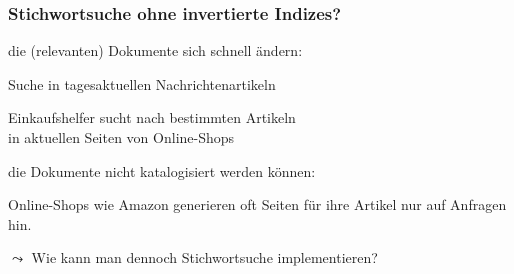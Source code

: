     \begin{frame}
      \frametitle{Stichwortsuche ohne invertierte Indizes?}
      
      \begin{Itemize}
        \item
          die (relevanten) Dokumente sich schnell ändern:
          \begin{Itemize}
            \item
              Suche in tagesaktuellen Nachrichtenartikeln
            \item
              Einkaufshelfer sucht nach bestimmten Artikeln \\
              in aktuellen Seiten von Online-Shops
          \end{Itemize}
        \item
          die Dokumente nicht katalogisiert werden können:
          \begin{Itemize}
            \item
              Online-Shops wie Amazon generieren oft Seiten für ihre Artikel
              nur auf Anfragen hin.
          \end{Itemize}
      \end{Itemize}
      $\leadsto$ Wie kann man dennoch Stichwortsuche implementieren?

    \end{frame}


